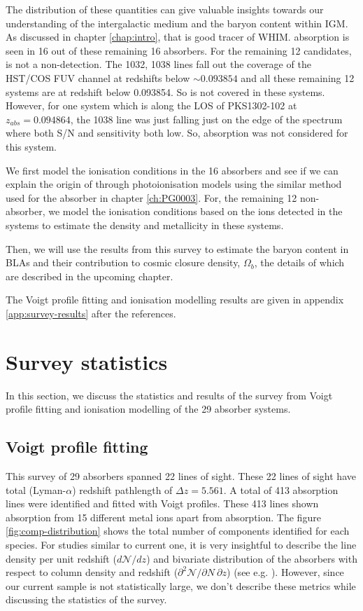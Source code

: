 The distribution of these quantities can give valuable insights towards our understanding of the intergalactic medium and the baryon content within IGM. As discussed in chapter \ref{chap:intro}, that  is good tracer of WHIM.  absorption is seen in 16 out of these remaining 16 absorbers. For the remaining 12 candidates,  is not a non-detection. The  1032, 1038 lines fall out the coverage of the HST/COS FUV channel at redshifts below $\sim 0.093854$ and all these remaining 12 systems are at redshift below 0.093854. So  is not covered in these systems. However, for one system which is along the LOS of PKS1302-102 at $z_{abs}=0.094864$, the  1038 line was just falling just on the edge of the spectrum where both S/N and sensitivity both low. So,  absorption was not considered for this system. 

We first model the ionisation conditions in the 16  absorbers and see if we can explain the origin of  through photoionisation models using the similar method used for the absorber in chapter \ref{ch:PG0003}. For, the remaining 12 non- absorber, we model the ionisation conditions based on the ions detected in the systems to estimate the density and metallicity in these systems. 

Then, we will use the results from this survey to estimate the baryon content in BLAs and their contribution to cosmic closure density, $\Omega_b$, the details of which are described in the upcoming chapter.

The Voigt profile fitting and ionisation modelling results are given in appendix \ref{app:survey-results} after the references.


\section{Survey statistics}

In this section, we discuss the statistics and results of the survey from Voigt profile fitting and ionisation modelling of the 29 absorber systems.

\subsection{Voigt profile fitting}

This survey of 29 absorbers spanned 22 lines of sight. These 22 lines of sight have total  (Lyman-$\alpha$) redshift pathlength of $\Delta z = 5.561$. A total of 413 absorption lines were identified and fitted with Voigt profiles. These 413 lines shown absorption from 15 different metal ions apart from  absorption. The figure \ref{fig:comp-distribution} shows the total number of components identified for each species. For studies similar to current one, it is very insightful to describe the line density per unit redshift ($d\mathcal{N}/dz$) and  bivariate distribution of the absorbers with respect to column density and redshift ($\partial ^2 \mathcal{N}/\partial N \ \partial z $) (see e.g. \citet{danforth-2016, Penton-2000, tilton_2012}). However, since our current sample is not statistically large, we don't describe these metrics while discussing the statistics of the survey.

